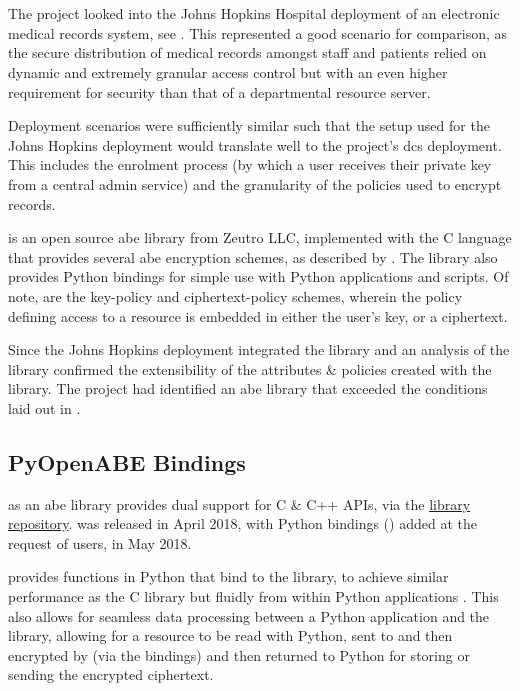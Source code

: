 \section{\OpenABE}
\label{sec:bkgr_openabe}

The project looked into the Johns Hopkins Hospital deployment of an electronic medical records system, see \citet{Akinyele2011}. This represented a good scenario for comparison, as the secure distribution of medical records amongst staff and patients relied on dynamic and extremely granular access control but with an even higher requirement for security than that of a departmental resource server.

Deployment scenarios were sufficiently similar such that the setup used for the Johns Hopkins deployment would translate well to the project's \acrfull{dcs} deployment. This includes the enrolment process (by which a user receives their private key from a central admin service) and the granularity of the policies used to encrypt records.

\OpenABE is an open source \acrfull{abe} library from Zeutro LLC, implemented with the C language that provides several \acrshort{abe} encryption schemes, as described by \citet{Akinyele2011}. The library also provides Python bindings for simple use with Python applications and scripts. Of note, are the key-policy and ciphertext-policy schemes, wherein the policy defining access to a resource is embedded in either the user's key, or a ciphertext.

Since the Johns Hopkins deployment integrated the \OpenABE library and an analysis of the library confirmed the extensibility of the attributes \& policies created with the library. The project had identified an \acrshort{abe} library that exceeded the conditions laid out in .

\subsection{PyOpenABE Bindings}
\label{subsec:bkgr_pyopenabe}

\OpenABE as an \acrshort{abe} library provides dual support for C \& C++ APIs, via the \href{https://github.com/zeutro/openabe/releases}{\OpenABE library repository}. \OpenABE was released in April 2018, with Python bindings (\PyOpenABE) added at the request of users, in May 2018.

\PyOpenABE provides functions in Python that bind to the \OpenABE library, to achieve similar performance as the C library but fluidly from within Python applications \citep{Akinyele2011}. This also allows for seamless data processing between a Python application and the \OpenABE library, allowing for a resource to be read with Python, sent to and then encrypted by \OpenABE (via the \PyOpenABE bindings) and then returned to Python for storing or sending the encrypted ciphertext.

